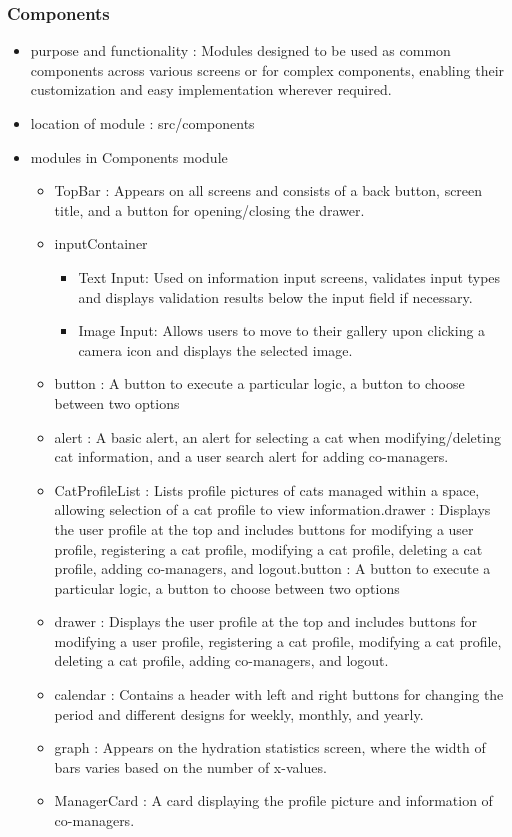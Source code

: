 \documentclass[conference]{IEEEtran}
\begin{document}
\subsubsection{Components}

\begin{itemize}
    \item purpose and functionality : Modules designed to be used as common components across various screens or for complex components, enabling their customization and easy implementation wherever required.
    \item location of module : src/components
    \item modules in Components module
    \begin{itemize}
        \item TopBar : Appears on all screens and consists of a back button, screen title, and a button for opening/closing the drawer.
        \item inputContainer
        \begin{itemize}
            \item Text Input: Used on information input screens, validates input types and displays validation results below the input field if necessary.
            \item Image Input: Allows users to move to their gallery upon clicking a camera icon and displays the selected image.
        \end{itemize}
        \item button : A button to execute a particular logic, a button to choose between two options
        \item alert : A basic alert, an alert for selecting a cat when modifying/deleting cat information, and a user search alert for adding co-managers.
        \item CatProfileList : Lists profile pictures of cats managed within a space, allowing selection of a cat profile to view information.drawer : Displays the user profile at the top and includes buttons for modifying a user profile, registering a cat profile, modifying a cat profile, deleting a cat profile, adding co-managers, and logout.button : A button to execute a particular logic, a button to choose between two options
        \item drawer : Displays the user profile at the top and includes buttons for modifying a user profile, registering a cat profile, modifying a cat profile, deleting a cat profile, adding co-managers, and logout.
        \item calendar : Contains a header with left and right buttons for changing the period and different designs for weekly, monthly, and yearly.
        \item graph : Appears on the hydration statistics screen, where the width of bars varies based on the number of x-values.
        \item ManagerCard : A card displaying the profile picture and information of co-managers.
        \vspace{0.5cm}
    \end{itemize}
\end{itemize}
\end{document}

